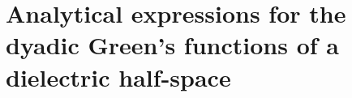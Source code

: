 \documentclass[letterpaper]{article}
\begin{document}
\section{Analytical expressions for the dyadic Green's functions of a dielectric 
         half-space}
%
%
%
%
%
%
%
%
\end{document}
